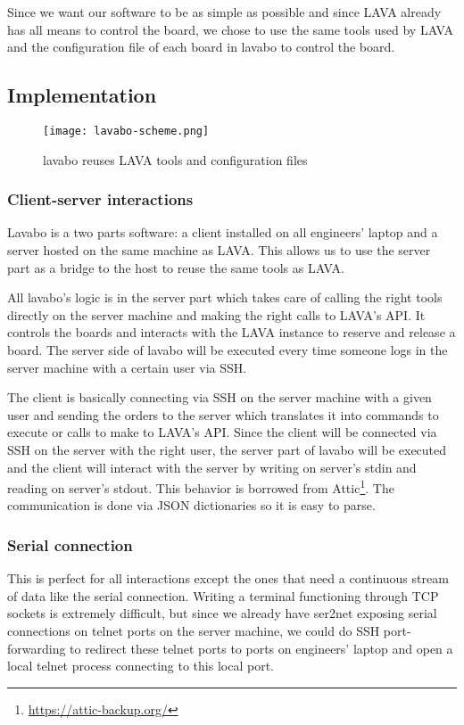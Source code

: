 Since we want our software to be as simple as possible and since LAVA already has all means to control the board, we chose to use the same tools used by LAVA and the configuration file of each board in lavabo to control the board.

\subsection{Implementation}

\begin{figure}[H]
  \texttt{[image: lavabo-scheme.png]}
  \caption{lavabo reuses LAVA tools and configuration files}
\end{figure}

\subsubsection{Client-server interactions}

Lavabo is a two parts software: a client installed on all engineers' laptop and a server hosted on the same machine as LAVA. This allows us to use the server part as a bridge to the host to reuse the same tools as LAVA.

All lavabo's logic is in the server part which takes care of calling the right tools directly on the server machine and making the right calls to LAVA's API. It controls the boards and interacts with the LAVA instance to reserve and release a board. The server side of lavabo will be executed every time someone logs in the server machine with a certain user via SSH.

The client is basically connecting via SSH on the server machine with a given user and sending the orders to the server which translates it into commands to execute or calls to make to LAVA's API. Since the client will be connected via SSH on the server with the right user, the server part of lavabo will be executed and the client will interact with the server by writing on server's stdin and reading on server's stdout. This behavior is borrowed from Attic\footnote{\url{https://attic-backup.org/}}. The communication is done via JSON dictionaries so it is easy to parse.

\subsubsection{Serial connection}

This is perfect for all interactions except the ones that need a continuous stream of data like the serial connection. Writing a terminal functioning through TCP sockets is extremely difficult, but since we already have ser2net exposing serial connections on telnet ports on the server machine, we could do SSH port-forwarding to redirect these telnet ports to ports on engineers' laptop and open a local telnet process connecting to this local port.

